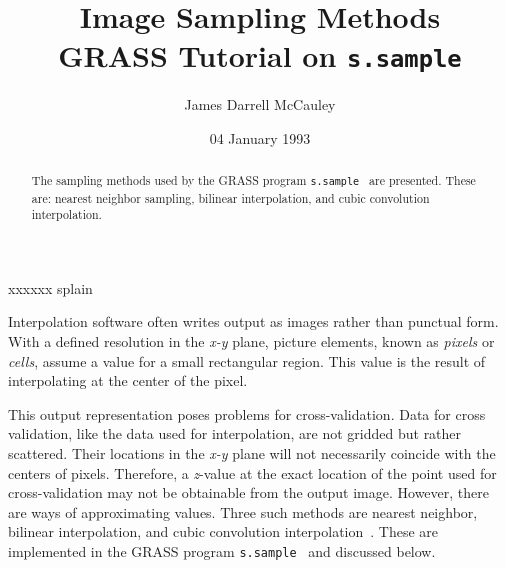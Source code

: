 \title{Image Sampling Methods\\ {\large GRASS Tutorial on {\tt s.sample}}}
\author{James Darrell McCauley}
\date{04 January 1993}
\def\fphi#1{\phi\left(#1\right)}
\begingroup\makeatletter
\def\x#1#2#3#4#5#6#7\relax{\def\x{#1#2#3#4#5#6}}
\expandafter\x\fmtname xxxxxx\relax \def\y{splain}
\ifx\x\y   %
\gdef\SetFigFont#1#2#3{%
  \ifnum #1<17 \tiny\else \ifnum #1<20 \small\else
  \ifnum #1<24 \normalsize\else \ifnum #1<29 \large\else
  \ifnum #1<34 \Large\else \ifnum #1<41 \LARGE\else
     \huge\fi\fi\fi\fi\fi\fi
  \csname #3\endcsname}
\else
\gdef\SetFigFont#1#2#3{\begingroup
  \count@#1\relax \ifnum 25<\count@ \count@25 \fi
  \def\x{\endgroup\@setsize\SetFigFont{#2pt}}%
  \expandafter\x
    \csname \romannumeral\the\count@ pt\expandafter\endcsname
    \csname @\romannumeral\the\count@ pt\endcsname
  \csname #3\endcsname}
\fi
\endgroup


\maketitle

\begin{abstract}
The sampling methods used by the GRASS program {\tt s.sample}~\cite{s.sample}
are presented. These are: nearest neighbor sampling, 
bilinear interpolation, and cubic convolution
interpolation.
\end{abstract}

Interpolation software often writes output as images rather
than punctual form. With a defined resolution in the {\em x-y\/}
plane, picture elements, known as {\em pixels\/} or {\em cells},
assume a value for a small rectangular region. This value is
the result of interpolating at the center of the pixel.

This output representation poses problems for cross-validation.
Data for cross validation, like the data used for interpolation,
are not gridded but rather scattered. Their locations in the
{\em x-y\/} plane will not necessarily coincide with the
centers of pixels. Therefore, a {\em z}-value at the
exact location of the point used for cross-validation
may not be obtainable from the output image. However, there
are ways of approximating values. Three such methods are
nearest neighbor, bilinear interpolation, and cubic convolution
interpolation~\cite{richards93}. These are implemented
in the GRASS program {\tt s.sample}~\cite{s.sample} and discussed below.

